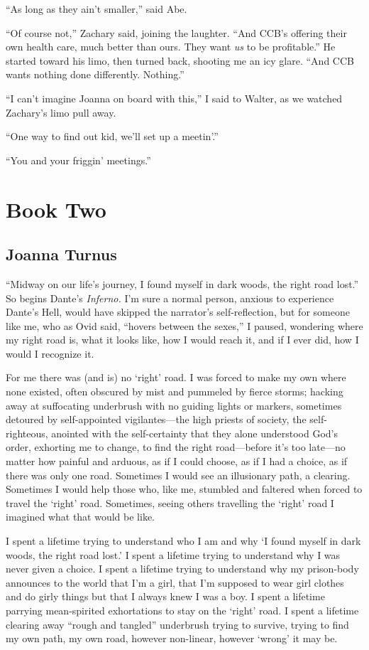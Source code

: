 ``As long as they ain't smaller,'' said Abe.

``Of course not,'' Zachary said, joining the laughter. ``And CCB's
offering their own health care, much better than ours. They want
\emph{us} to be profitable.'' He started toward his limo, then turned
back, shooting me an icy glare. ``And CCB wants nothing done
differently. Nothing.''

``I can't imagine Joanna on board with this,'' I said to Walter, as we
watched Zachary's limo pull away.

``One way to find out kid, we'll set up a meetin'.''

``You and your friggin' meetings.''

\part{Book Two}\setcounter{chapter}{0}

\chapter{Joanna Turnus}

\titlemark

``Midway on our life's journey, I found myself in dark woods, the right
road lost.'' So begins Dante's \emph{Inferno.} I'm sure a normal person,
anxious to experience Dante's Hell, would have skipped the narrator's
self-reflection, but for someone like me, who as Ovid said, ``hovers
between the sexes,'' I paused, wondering where my right road is, what it
looks like, how I would reach it, and if I ever did, how I would I
recognize it.

For me there was (and is) no `right' road. I was forced to make my own
where none existed, often obscured by mist and pummeled by fierce
storms; hacking away at suffocating underbrush with no guiding lights or
markers, sometimes detoured by self-appointed vigilantes---the high
priests of society, the self-righteous, anointed with the self-certainty
that they alone understood God's order, exhorting me to change, to find
the right road---before it's too late---no matter how painful and
arduous, as if I could choose, as if I had a choice, as if there was
only one road. Sometimes I would see an illusionary path, a clearing.
Sometimes I would help those who, like me, stumbled and faltered when
forced to travel the `right' road. Sometimes, seeing others travelling
the `right' road I imagined what that would be like.

I spent a lifetime trying to understand who I am and why `I found myself
in dark woods, the right road lost.' I spent a lifetime trying to
understand why I was never given a choice. I spent a lifetime trying to
understand why my prison-body announces to the world that I'm a girl,
that I'm supposed to wear girl clothes and do girly things but that I
always knew I was a boy. I spent a lifetime parrying mean-spirited
exhortations to stay on the `right' road. I spent a lifetime clearing
away ``rough and tangled'' underbrush trying to survive, trying to find
my own path, my own road, however non-linear, however `wrong' it may be.

